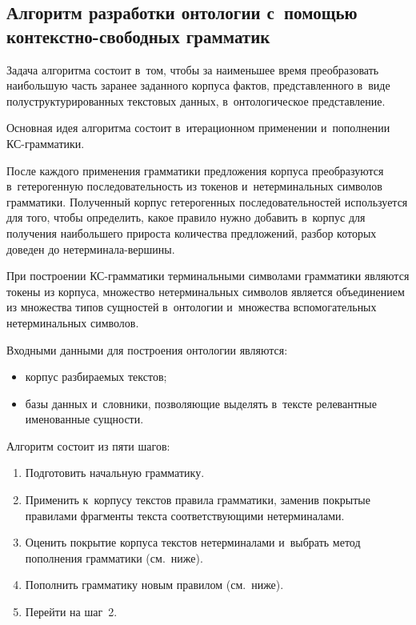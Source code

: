 \begin{multicols}{2}
  \section{Алгоритм разработки онтологии с~помощью контекстно-свободных грамматик}
  
  Задача алгоритма состоит в~том, чтобы за наименьшее время преобразовать 
наибольшую часть заранее заданного корпуса фактов, представленного в~виде 
полуструктурированных текстовых данных, в~онтологическое представление.
  
  Основная идея алгоритма состоит в~итерационном применении и~пополнении 
КС-грам\-ма\-ти\-ки.\linebreak\vspace*{-12pt}


\noindent После каждого применения грамматики предложения 
корпуса преобразуются в~гетерогенную последовательность из токенов 
и~нетерминальных \mbox{символов} грамматики. Полученный корпус гетерогенных 
последовательностей используется для того, чтобы определить, какое правило 
нужно добавить в~корпус для получения наибольшего прироста количества 
предложений, разбор которых доведен до не\-тер\-ми\-на\-ла-вер\-шины.
  
  При построении КС-грам\-ма\-ти\-ки терминальными символами грамматики 
являются токены из корпуса, множество нетерминальных символов является 
объединением из множества типов сущностей в~онтологии и~множества 
вспомогательных нетерминальных символов.
  
  Входными данными для построения онтологии являются:
  \begin{itemize}
\item корпус разбираемых текстов;\\[-15pt]
\item базы данных и~словники, позволяющие выделять в~тексте релевантные 
именованные сущности.
\end{itemize}

  Алгоритм состоит из пяти шагов:
  \begin{enumerate}[1.]
\item Подготовить начальную грамматику.\\[-15pt]
\item Применить к~корпусу текстов правила грамматики, заменив покрытые 
правилами фрагменты текста соответствующими нетерминалами.\\[-15pt]
\item Оценить покрытие корпуса текстов нетерминалами и~выбрать метод 
пополнения грамматики (см.\ ниже).\\[-15pt]
\item Пополнить грамматику новым правилом (см.\ ниже).\\[-15pt]
\item Перейти на шаг~2.
  \end{enumerate}
  

\end{multicols}
